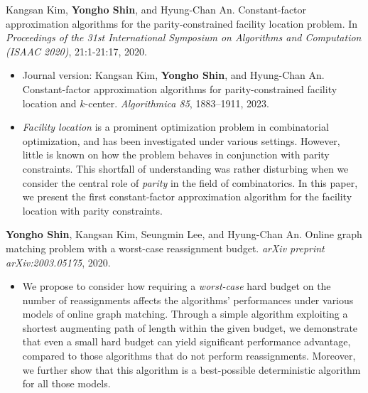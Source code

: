 \documentclass{article}
\newcommand{\killinitspace}{-0.7em}
\begin{document}
Kangsan Kim, \textbf{Yongho Shin}, and Hyung-Chan An. Constant-factor approximation algorithms for the parity-constrained facility location problem. In \emph{Proceedings of the 31st International Symposium on Algorithms and Computation (ISAAC 2020)}, 21:1-21:17, 2020.
\vspace{\killinitspace}
\begin{itemize}
\item Journal version: Kangsan Kim, \textbf{Yongho Shin}, and Hyung-Chan An. Constant-factor approximation algorithms for parity-constrained facility location and $k$-center. \emph{Algorithmica 85}, 1883–1911, 2023.
\item \emph{Facility location} is a prominent optimization problem in combinatorial optimization, and has been investigated under various settings. However, little is known on how the problem behaves in conjunction with parity constraints. This shortfall of understanding was rather disturbing when we consider the central role of \emph{parity} in the field of combinatorics. In this paper, we present the first constant-factor approximation algorithm for the facility location with parity constraints.
\end{itemize}

\textbf{Yongho Shin}, Kangsan Kim, Seungmin Lee, and Hyung-Chan An. Online graph matching problem with a worst-case reassignment budget. \emph{arXiv preprint arXiv:2003.05175}, 2020.
\vspace{\killinitspace}
\begin{itemize}
\item We propose to consider how requiring a \emph{worst-case} hard budget on the number of reassignments affects the algorithms' performances under various models of online graph matching. Through a simple algorithm exploiting a shortest augmenting path of length within the given budget, we demonstrate that even a small hard budget can yield significant performance advantage, compared to those algorithms that do not perform reassignments. Moreover, we further show that this algorithm is a best-possible deterministic algorithm for all those models.
\end{itemize}
\end{document}
